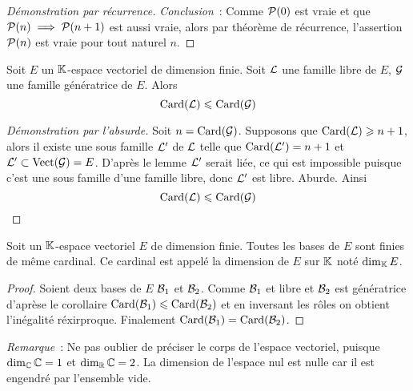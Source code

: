 \begin{proof}[Démonstration par récurrence]
  \emph{Conclusion}~: Comme \(\P(0)\) est vraie et que \(\P(n) \implies \P(n+1)\) est aussi vraie, alors par théorème de récurrence, l'assertion \(\P(n)\) est vraie pour tout naturel \(n\).
\end{proof}

\begin{cor}
  Soit \(E\) un \(\K\)-espace vectoriel de dimension finie. Soit \(\Lb\) une famille libre de \(E\), \(\G\) une famille génératrice de \(E\). Alors
  \begin{equation}
    \Card(\Lb) \leqslant \Card(\G)
  \end{equation}
\end{cor}
\begin{proof}[Démonstration par l'absurde]
  Soit \(n = \Card(\G)\). Supposons que \(\Card(\Lb) \geqslant n+1\), alors il existe une sous famille \(\Lb'\) de \(\Lb\) telle que \(\Card(\Lb')=n+1\) et \(\Lb' \subset \VectEngendre(\G)=E\). D'après le lemme \(\Lb'\) serait liée, ce qui est impossible puisque c'est une sous famille d'une famille libre, donc \(\Lb'\) est libre. Aburde.  Ainsi 
  \begin{equation}
    \Card(\Lb) \leqslant \Card(\G)
  \end{equation}
\end{proof}

\begin{theo}
  Soit un \(\K\)-espace vectoriel \(E\) de dimension finie. Toutes les bases de \(E\) sont finies de même cardinal. Ce cardinal est appelé la dimension de \(E\) sur \(\K\) noté \(\Dim_\K E\).
\end{theo}
\begin{proof}
  Soient deux bases de \(E\) \(\B_1\) et \(\B_2\). Comme \(\B_1\) et libre et \(\B_2\) est génératrice d'aprèse le corollaire \(\Card(\B_1) \leqslant \Card(\B_2)\) et en inversant les rôles on obtient l'inégalité réxirproque. Finalement \(\Card(\B_1)=\Card(\B_2)\).
\end{proof}

\emph{Remarque}~: Ne pas oublier de préciser le corps de l'espace vectoriel, puisque \(\Dim_\C \C=1\) et \(\Dim_\R \C=2\). La dimension de l'espace nul est nulle car il est engendré par l'ensemble vide.

